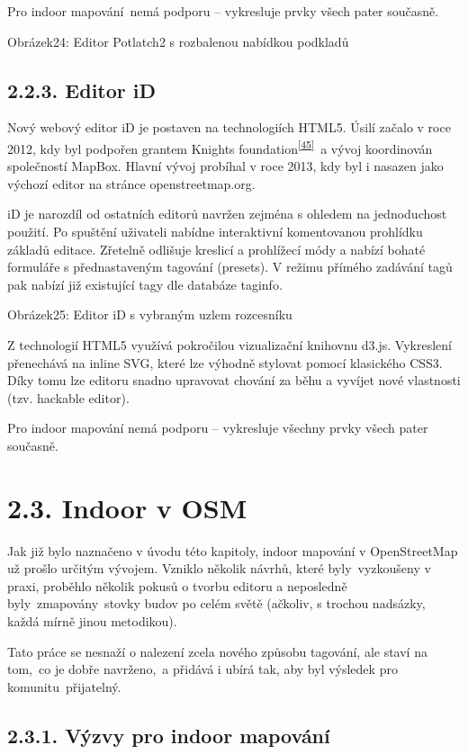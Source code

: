 Pro indoor mapování~nemá podporu -- vykresluje prvky všech pater současně.

Obrázek24: Editor Potlatch2 s rozbalenou nabídkou podkladů

\subsection{2.2.3. Editor iD}\label{editor-id}

Nový webový editor iD je postaven na technologiích HTML5. Úsilí začalo v roce 2012, kdy byl podpořen grantem Knights foundation\textsuperscript{\href{}{{[}45{]}}}~a vývoj koordinován společností MapBox. Hlavní vývoj probíhal v roce 2013, kdy byl i nasazen jako výchozí editor na stránce openstreetmap.org.

iD je narozdíl od ostatních editorů navržen zejména s ohledem na jednoduchost použití. Po spuštění uživateli nabídne interaktivní komentovanou prohlídku základů editace. Zřetelně odlišuje kreslicí a prohlížecí módy a nabízí bohaté formuláře s přednastaveným tagování (presets). V režimu přímého zadávání tagů pak nabízí již existující tagy dle databáze taginfo.

Obrázek25: Editor iD s vybraným uzlem rozcesníku

Z technologií HTML5 využívá pokročilou vizualizační knihovnu d3.js. Vykreslení přenechává na inline SVG, které lze výhodně stylovat pomocí klasického CSS3. Díky tomu lze editoru snadno upravovat chování za běhu a vyvíjet nové vlastnosti (tzv. hackable editor).

Pro indoor mapování nemá podporu -- vykresluje všechny prvky všech pater současně.

\section{2.3. Indoor v OSM}\label{indoor-v-osm}

Jak již bylo naznačeno v úvodu této kapitoly, indoor mapování v OpenStreetMap už prošlo určitým vývojem. Vzniklo několik návrhů, které byly~vyzkoušeny v praxi, proběhlo několik pokusů o tvorbu editoru a neposledně byly~zmapovány~stovky budov po celém světě (ačkoliv, s trochou nadsázky, každá mírně jinou metodikou).

Tato práce se nesnaží o nalezení zcela nového způsobu tagování, ale staví na tom,~co je dobře navrženo,~a přidává i ubírá tak, aby byl výsledek pro komunitu~přijatelný.

\subsection{2.3.1. Výzvy pro indoor mapování}\label{vuxfdzvy-pro-indoor-mapovuxe1nuxed}

